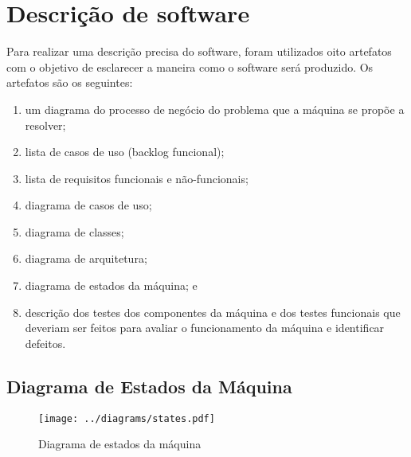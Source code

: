 \section{Descrição de software}

Para realizar uma descrição precisa do software, foram utilizados oito artefatos
com o objetivo de esclarecer a maneira como o software será produzido. Os
artefatos são os seguintes:

\begin{enumerate}
  \item
    um diagrama do processo de negócio do problema que a máquina se propõe a
    resolver;
  \item lista de casos de uso (backlog funcional);
  \item lista de requisitos funcionais e não-funcionais;
  \item diagrama de casos de uso;
  \item diagrama de classes;
  \item diagrama de arquitetura;
  \item diagrama de estados da máquina; e
  \item
    descrição dos testes dos componentes da máquina e dos testes funcionais que
    deveriam ser feitos para avaliar o funcionamento da máquina e identificar
    defeitos.
\end{enumerate}

\subsection{Diagrama de Estados da Máquina}

\begin{figure}
  \caption{\label{fig:states} Diagrama de estados da máquina}

  \begin{center}
    \texttt{[image: ../diagrams/states.pdf]}
  \end{center}

\end{figure}
